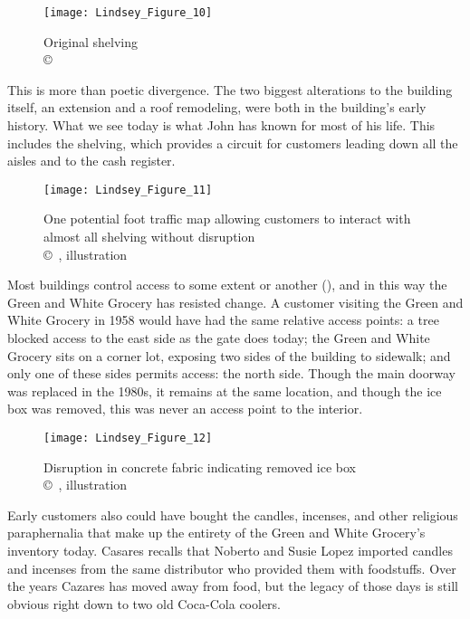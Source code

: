 \begin{figure}[!tb]
	\texttt{[image: Lindsey\_Figure\_10]}
	\caption{Original shelving\\
		{\normalfont\scriptsize \copyright\
			\shortauthor
	}}
	\label{fig:Lindsey_Figure_10}
\end{figure}

This is more than poetic divergence. The two biggest alterations to the building itself, an extension and a roof remodeling, were both in the building's early history. What we see today is what John has known for most of his life. This includes the shelving, which provides a circuit for customers leading down all the aisles and to the cash register.

\begin{figure}[!tb]
	\texttt{[image: Lindsey\_Figure\_11]}
	\caption{One potential foot traffic map allowing customers to interact with almost all shelving without disruption\\
		{\normalfont\scriptsize \copyright\
			\shortauthor, illustration
	}}
	\label{fig:Lindsey_Figure_11}
\end{figure}

Most buildings control access to some extent or another (\cites{campion}[52]{glassie}), and in this way the Green and White Grocery has resisted change. A customer visiting the Green and White Grocery in 1958 would have had the same relative access points: a tree blocked access to the east side as the gate does today; the Green and White Grocery sits on a corner lot, exposing two sides of the building to sidewalk; and only one of these sides permits access: the north side. Though the main doorway was replaced in the 1980s, it remains at the same location, and though the ice box was removed, this was never an access point to the interior.

\begin{figure}[!tb]
	\texttt{[image: Lindsey\_Figure\_12]}
	\caption{Disruption in concrete fabric indicating removed ice box\\
		{\normalfont\scriptsize \copyright\
			\shortauthor, illustration
	}}
	\label{fig:Lindsey_Figure_12}
\end{figure}

Early customers also could have bought the candles, incenses, and other religious paraphernalia that make up the entirety of the Green and White Grocery's inventory today. Casares recalls that Noberto and Susie Lopez imported candles and incenses from the same distributor who provided them with foodstuffs. Over the years Cazares has moved away from food, but the legacy of those days is still obvious right down to two old Coca-Cola coolers.

